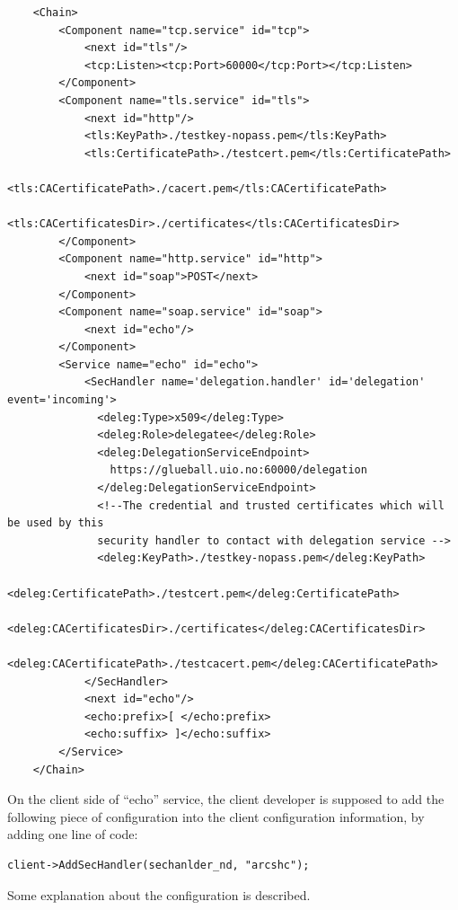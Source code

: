 \documentclass{article}                            %
\begin{document}
\begin{verbatim}
    <Chain>
        <Component name="tcp.service" id="tcp">
            <next id="tls"/>
            <tcp:Listen><tcp:Port>60000</tcp:Port></tcp:Listen>
        </Component>
        <Component name="tls.service" id="tls">
            <next id="http"/>
            <tls:KeyPath>./testkey-nopass.pem</tls:KeyPath>
            <tls:CertificatePath>./testcert.pem</tls:CertificatePath>
            <tls:CACertificatePath>./cacert.pem</tls:CACertificatePath>
              <tls:CACertificatesDir>./certificates</tls:CACertificatesDir>
        </Component>
        <Component name="http.service" id="http">
            <next id="soap">POST</next>
        </Component>
        <Component name="soap.service" id="soap">
            <next id="echo"/>
        </Component>
        <Service name="echo" id="echo">
            <SecHandler name='delegation.handler' id='delegation' event='incoming'>
              <deleg:Type>x509</deleg:Type>
              <deleg:Role>delegatee</deleg:Role>
              <deleg:DelegationServiceEndpoint>
                https://glueball.uio.no:60000/delegation
              </deleg:DelegationServiceEndpoint>
              <!--The credential and trusted certificates which will be used by this
              security handler to contact with delegation service -->
              <deleg:KeyPath>./testkey-nopass.pem</deleg:KeyPath>
              <deleg:CertificatePath>./testcert.pem</deleg:CertificatePath>
              <deleg:CACertificatesDir>./certificates</deleg:CACertificatesDir>
              <deleg:CACertificatePath>./testcacert.pem</deleg:CACertificatePath>
            </SecHandler>
            <next id="echo"/>
            <echo:prefix>[ </echo:prefix>
            <echo:suffix> ]</echo:suffix>
        </Service>
    </Chain>
\end{verbatim}

On the client side of ``echo'' service, the client developer is supposed to add the following piece of configuration into the client configuration information, by adding one line of code:

\begin{verbatim}
client->AddSecHandler(sechanlder_nd, "arcshc");
\end{verbatim}

Some explanation about the configuration is described.
\end{document}
